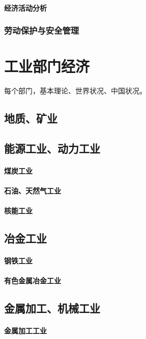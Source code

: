 \documentclass[UTF8]{../../RepresentationUniverse}
\begin{document}
        \subsubsection{经济活动分析}
    \subsection{劳动保护与安全管理}










\chapter{工业部门经济}
每个部门，基本理论、世界状况、中国状况。

\section{地质、矿业}
\section{能源工业、动力工业}
    \subsubsection{煤炭工业}
    \subsubsection{石油、天然气工业}
    \subsubsection{核能工业}
\section{冶金工业}
    \subsubsection{钢铁工业}
    \subsubsection{有色金属冶金工业}
\section{金属加工、机械工业}
    \subsubsection{金属加工工业}
\end{document}
